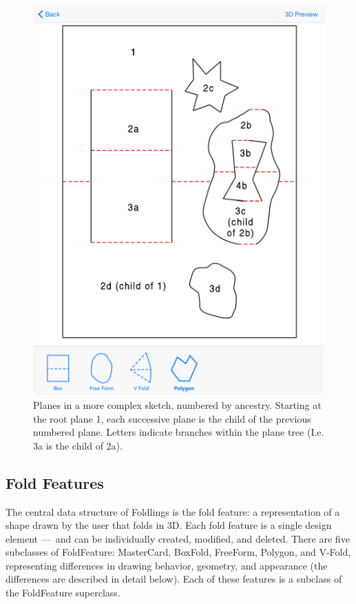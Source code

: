 \begin{figure}[htbp]
\centering
\includegraphics{figures/33_UI_Interface_Data_Structures/complex_sketch.pdf}
\caption{Planes in a more complex sketch, numbered by ancestry. Starting
at the root plane 1, each successive plane is the child of the previous
numbered plane. Letters indicate branches within the plane tree (I.e. 3a
is the child of 2a).}
\end{figure}

\subsection{Fold Features}\label{fold-features}

The central data structure of Foldlings is the fold feature: a
representation of a shape drawn by the user that folds in 3D. Each fold
feature is a single design element ---~and can be individually created,
modified, and deleted. There are five subclasses of FoldFeature:
MasterCard, BoxFold, FreeForm, Polygon, and V-Fold, representing
differences in drawing behavior, geometry, and appearance (the
differences are described in detail below). Each of these features is a
subclass of the FoldFeature superclass.

